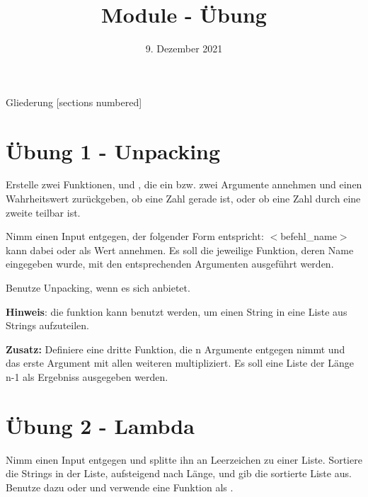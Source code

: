 



\title{Module - Übung}
\date{9. Dezember 2021}


\maketitle

\begin{frame}{Gliederung}
	[sections numbered]
	\tableofcontents
\end{frame}

\section{Übung 1 - Unpacking}
\begin{frame}
	Erstelle zwei Funktionen,  und , die ein bzw. zwei Argumente annehmen und einen Wahrheitswert zurückgeben, ob eine Zahl gerade ist, oder ob eine Zahl durch eine zweite teilbar ist.
	
	Nimm einen Input entgegen, der folgender Form entspricht:
	$<$befehl\_name$>$ kann dabei  oder  als Wert annehmen.
	Es soll die jeweilige Funktion, deren Name eingegeben wurde, mit den entsprechenden Argumenten ausgeführt werden.
	
	Benutze \alert{Unpacking}, wenn es sich anbietet.
	
	\textbf{Hinweis}: die  funktion kann benutzt werden, um einen String in eine Liste aus Strings aufzuteilen.
\end{frame}
\begin{frame}
	\textbf{Zusatz:}
	Definiere eine dritte Funktion,  die n Argumente entgegen nimmt und das erste Argument mit allen weiteren multipliziert. Es soll eine Liste der Länge n-1 als Ergebniss ausgegeben werden.
\end{frame}

\section{Übung 2 - Lambda}
\begin{frame}
	Nimm einen Input entgegen und splitte ihn an Leerzeichen zu einer Liste. Sortiere die Strings in der Liste, aufsteigend nach Länge, und gib die sortierte Liste aus.
	Benutze dazu  oder  und verwende eine  Funktion als .
\end{frame}


